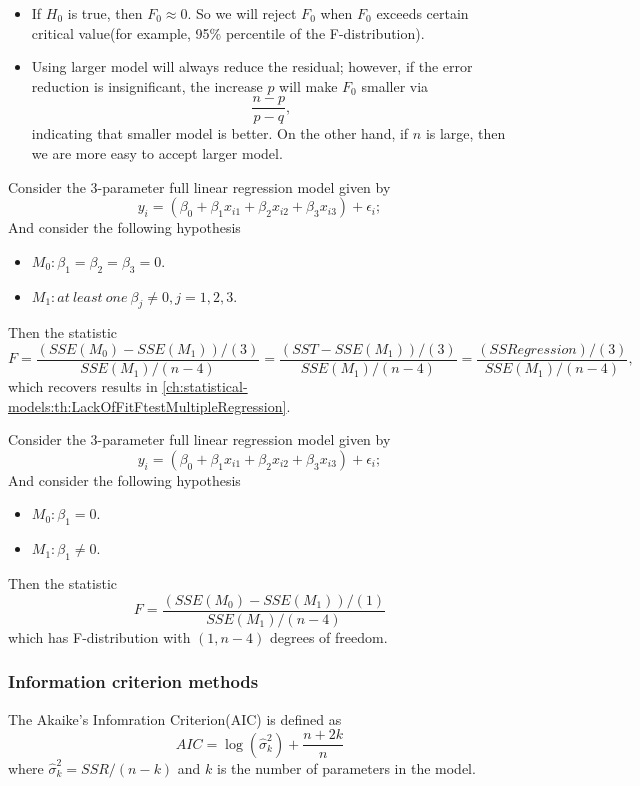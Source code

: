 \begin{refsection}
\begin{remark}\hfill
	\begin{itemize}
		\item If $H_0$ is true, then $F_0 \approx 0$. So we will reject $F_0$ when $F_0$ exceeds certain critical value(for example, 95\% percentile of the F-distribution).
		\item Using larger model will always reduce the residual; however, if the error reduction is insignificant, the increase $p$ will make $F_0$ smaller via $$\frac{n-p}{p-q},$$ indicating that smaller model is better. On the other hand, if $n$ is large, then we are more easy to accept larger model. 
	\end{itemize}	
\end{remark}


\begin{example}
	Consider the 3-parameter full linear regression model given by
	$$y_i = (\beta_0 + \beta_1 x_{i1} + \beta_2 x_{i2} + \beta_3 x_{i3}) + \epsilon_i;$$
	And consider the following hypothesis
	\begin{itemize}
		\item $M_0: \beta_1 = \beta_2 = \beta_3 = 0$.
		\item $M_1: at~least~one~\beta_j \neq 0, j=1,2,3$.
	\end{itemize}
	Then the statistic
	$$F = \frac{(SSE(M_0) - SSE(M_1))/(3)}{SSE(M_1)/(n-4)} = \frac{(SST - SSE(M_1))/(3)}{SSE(M_1)/(n-4)} =  \frac{(SSRegression)/(3)}{SSE(M_1)/(n-4)},$$
	which recovers results in \autoref{ch:statistical-models:th:LackOfFitFtestMultipleRegression}.	
\end{example}

\begin{example}
	Consider the 3-parameter full linear regression model given by
	$$y_i = (\beta_0 + \beta_1 x_{i1} + \beta_2 x_{i2} + \beta_3 x_{i3}) + \epsilon_i;$$
	And consider the following hypothesis
	\begin{itemize}
		\item $M_0: \beta_1 =  0$.
		\item $M_1: \beta_1 \neq 0$.
	\end{itemize}
	Then the statistic
	$$F = \frac{(SSE(M_0) - SSE(M_1))/(1)}{SSE(M_1)/(n-4)}$$
	which has F-distribution with $(1,n-4)$ degrees of freedom. 	
\end{example}


\subsubsection{Information criterion methods}
\begin{definition}
	The Akaike's Infomration Criterion(AIC) is defined as
	$$AIC = \log(\hat{\sigma}_k^2) + \frac{n+2k}{n}$$
	where $\hat{\sigma}_k^2 = SSR/(n-k)$ and $k$ is the number of parameters in the model.
\end{definition}


\end{refsection}
